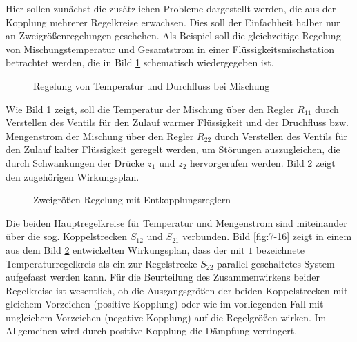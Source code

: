 Hier sollen zunächst die zusätzlichen Probleme dargestellt werden, die aus der Kopplung mehrerer Regelkreise erwachsen.
Dies soll der Einfachheit halber nur an Zweigrößenregelungen geschehen.
Als Beispiel soll die gleichzeitige Regelung von Mischungstemperatur und Gesamtstrom in einer Flüssigkeitsmischstation betrachtet werden, die in Bild \ref{fig:7-14} schematisch wiedergegeben ist.

\begin{figure}[ht]
    \centering
    \caption{Regelung von Temperatur und Durchfluss bei Mischung}
    \label{fig:7-14}
\end{figure}

Wie Bild \ref{fig:7-14} zeigt, soll die Temperatur der Mischung über den Regler \(R_{11}\) durch Verstellen des Ventils für den Zulauf warmer Flüssigkeit und der Druchfluss bzw. Mengenstrom der Mischung über den Regler \(R_{22}\) durch Verstellen des Ventils für den Zulauf kalter Flüssigkeit geregelt werden, um Störungen auszugleichen, die durch Schwankungen der Drücke \(z_1\) und \(z_2\) hervorgerufen werden.
Bild \ref{fig:7-15} zeigt den zugehörigen Wirkungsplan.

\begin{figure}[ht]
    \centering
    \caption{Zweigrößen-Regelung mit Entkopplungsreglern}
    \label{fig:7-15}
\end{figure}

Die beiden Hauptregelkreise für Temperatur und Mengenstrom sind miteinander über die sog. Koppelstrecken \(S_{12}\) und \(S_{21}\) verbunden.
Bild \ref{fig:7-16} zeigt in einem aus dem Bild \ref{fig:7-15} entwickelten Wirkungsplan, dass der mit \(1\) bezeichnete Temperaturregelkreis als ein zur Regelstrecke \(S_{22}\) parallel geschaltetes System aufgefasst werden kann.
Für die Beurteilung des Zusammenwirkens beider Regelkreise ist wesentlich, ob die Ausgangsgrößen der beiden Koppelstrecken mit gleichem Vorzeichen (positive Kopplung) oder wie im vorliegenden Fall mit ungleichem Vorzeichen (negative Kopplung) auf die Regelgrößen wirken.
Im Allgemeinen wird durch positive Kopplung die Dämpfung verringert.

